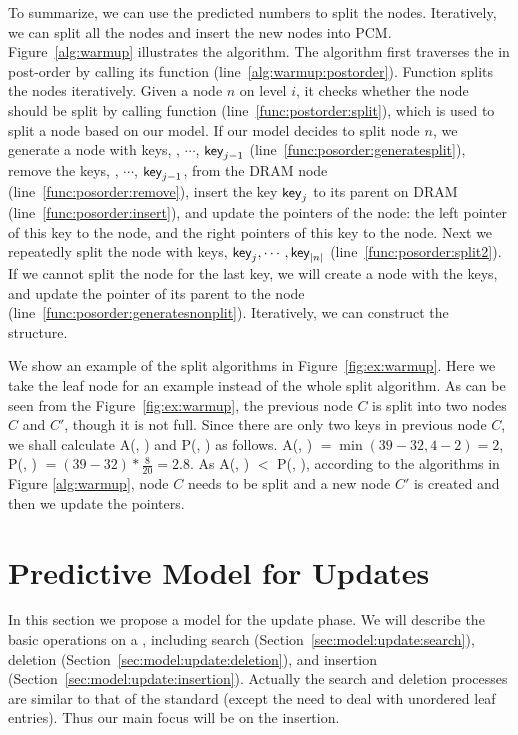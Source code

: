 To summarize, we can use the predicted numbers to split the nodes. Iteratively, we can split all the nodes and insert the new nodes into PCM. Figure~\ref{alg:warmup} illustrates the algorithm. The \warmup algorithm first traverses
the \bplustree in post-order by calling its function \postorder (line~\ref{alg:warmup:postorder}). Function \postorder splits the nodes iteratively. Given a node $n$ on level $i$, it checks
whether the node should be split by calling function \splitfunc (line~\ref{func:postorder:split}), which is used to split a node based on our \predict model. If our model decides to split node $n$, we generate a \bptree node with keys, \el, $\cdots$, $\textsf{key}_{j-1}$ (line~\ref{func:posorder:generatesplit}), remove the keys, \el, $\cdots$, $\textsf{key}_{j-1}$, from the DRAM \bplustree node (line~\ref{func:posorder:remove}), insert the key $\textsf{key}_{j}$ to its parent on DRAM \bplustree (line~\ref{func:posorder:insert}), and update the pointers of the \bplustree node: the left pointer of this key to the \bptree node, and the right pointers of this key to the \bplustree node. Next we repeatedly split the node with keys, $\textsf{key}_{j}, \cdots, \textsf{key}_{|n|}$ (line~\ref{func:posorder:split2}). If we cannot split the node for the last key, we will create a \bptree node with the keys, and update the pointer of its parent to the \bptree node (line~\ref{func:posorder:generatesnonplit}). Iteratively, we can construct the \bptree structure.

We show an example of the split algorithms in Figure~\ref{fig:ex:warmup}. Here we take the leaf node for an example instead of the whole split algorithm. As can be seen from the Figure~\ref{fig:ex:warmup}, the previous node $C$ is split into two nodes $C$ and $C'$, though it is not full. Since there are only two keys in previous node $C$, we shall calculate A(\el, ) and P(\el, ) as follows. A(\el, ) $= \min(39 - 32, 4 - 2) = 2$, P(\el, ) $= (39 - 32) * \frac{8}{20} = 2.8$. As A(\el, ) $<$ P(\el, ), according to the algorithms in Figure \ref{alg:warmup}, node $C$ needs to be split and a new node $C'$ is created and then we update the pointers.

\section{Predictive Model for Updates}  \label{sec:model:update}


In this section we propose a \predict model for the update phase. We will describe the basic operations on a \bptree, including search (Section~\ref{sec:model:update:search}), deletion (Section~\ref{sec:model:update:deletion}), and insertion (Section~\ref{sec:model:update:insertion}). Actually the search and deletion processes are similar to that of the standard \bplustree (except the need
to deal with unordered leaf entries). Thus
our main focus will be on the insertion.

